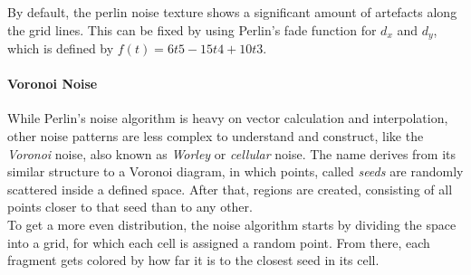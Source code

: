\noindent
By default, the perlin noise texture shows a significant amount of artefacts along the grid lines. This can be fixed by using Perlin's fade function \cite{online:perlin:impl} for $d_x$ and $d_y$, which is defined by $f(t) = 6t5-15t4+10t3$.

\clearpage
\paragraph{Voronoi Noise}
While Perlin's noise algorithm is heavy on vector calculation and interpolation, other noise patterns are less complex to understand and construct, like the \textit{Voronoi} noise, also known as \textit{Worley} or \textit{cellular} noise.
The name derives from its similar structure to a Voronoi diagram, in which points, called \textit{seeds} are randomly scattered inside a defined space. After that, regions are created, consisting of all points closer to that seed than to any other.
\\
To get a more even distribution, the noise algorithm starts by dividing the space into a grid, for which each cell is assigned a random point. From there, each fragment gets colored by how far it is to the closest seed in its cell.

